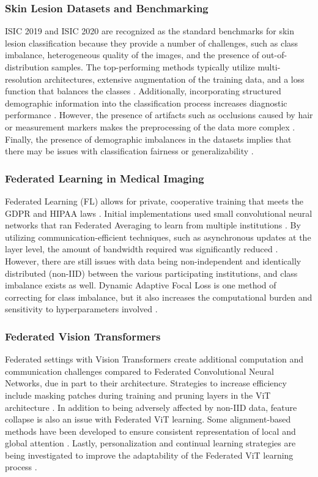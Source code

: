 \documentclass{ieeeaccess}
\begin{document}
\subsubsection{Skin Lesion Datasets and Benchmarking}
ISIC 2019 and ISIC 2020 are recognized as the standard benchmarks for skin lesion classification because they provide a number of challenges, such as class imbalance, heterogeneous quality of the images, and the presence of out-of-distribution samples. The top-performing methods typically utilize multi-resolution architectures, extensive augmentation of the training data, and a loss function that balances the classes \cite{Gessert2020}. Additionally, incorporating structured demographic information into the classification process increases diagnostic performance \cite{Nunnari2020}. However, the presence of artifacts such as occlusions caused by hair or measurement markers makes the preprocessing of the data more complex \cite{Wegley2026}. Finally, the presence of demographic imbalances in the datasets implies that there may be issues with classification fairness or generalizability \cite{SkinDiversity2024}.
\subsubsection{Federated Learning in Medical Imaging}
Federated Learning (FL) allows for private, cooperative training that meets the GDPR and HIPAA laws \cite{Guan2024}. Initial implementations used small convolutional neural networks that ran Federated Averaging to learn from multiple institutions \cite{Subramanian2025}. By utilizing communication-efficient techniques, such as asynchronous updates at the layer level, the amount of bandwidth required was significantly reduced \cite{Yaqoob2023}. However, there are still issues with data being non-independent and identically distributed (non-IID) between the various participating institutions, and class imbalance exists as well. Dynamic Adaptive Focal Loss is one method of correcting for class imbalance, but it also increases the computational burden and sensitivity to hyperparameters involved \cite{Zhao2025}.
\subsubsection{Federated Vision Transformers}
Federated settings with Vision Transformers create additional computation and communication challenges compared to Federated Convolutional Neural Networks, due in part to their architecture. Strategies to increase efficiency include masking patches during training \cite{Wu2024} and pruning layers in the ViT architecture \cite{Paxton2024}. In addition to being adversely affected by non-IID data, feature collapse is also an issue with Federated ViT learning. Some alignment-based methods have been developed to ensure consistent representation of local and global attention \cite{Darzi2024}. Lastly, personalization and continual learning strategies are being investigated to improve the adaptability of the Federated ViT learning process \cite{Zuo2024,Yao2024}.
\end{document}
